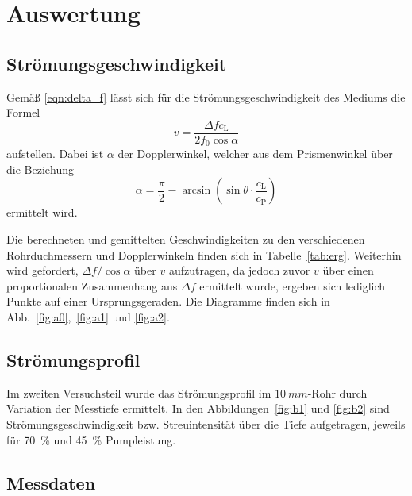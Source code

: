 \section{Auswertung}
\label{sec:Auswertung}

\subsection{Strömungsgeschwindigkeit}

Gemäß \eqref{eqn:delta_f} lässt sich für die Strömungsgeschwindigkeit des Mediums die Formel
\begin{equation}
  v = \frac{\Delta f c_\text{L}}{2 f_0 \cos \alpha}
\end{equation}
aufstellen. Dabei ist $\alpha$ der Dopplerwinkel, welcher aus dem Prismenwinkel über die Beziehung
\begin{equation}
  \alpha = \frac{\pi}{2} - \arcsin\left({\sin \theta \cdot \frac{c_\text{L}}{c_\text{P}}}\right)
\end{equation}
ermittelt wird.

Die berechneten und gemittelten Geschwindigkeiten zu den verschiedenen Rohrduchmessern und Dopplerwinkeln finden sich in Tabelle~\ref{tab:erg}. Weiterhin wird gefordert, $\Delta f / \cos \alpha$ über $v$ aufzutragen, da jedoch zuvor $v$ über einen proportionalen Zusammenhang aus $\Delta f$ ermittelt wurde, ergeben sich lediglich Punkte auf einer Ursprungsgeraden. Die Diagramme finden sich in Abb.~\ref{fig:a0},~\ref{fig:a1} und \ref{fig:a2}.


\subsection{Strömungsprofil}
Im zweiten Versuchsteil wurde das Strömungsprofil im $\SI{10}{mm}$-Rohr durch Variation der Messtiefe ermittelt. In den Abbildungen~\ref{fig:b1} und \ref{fig:b2} sind Strömungsgeschwindigkeit bzw. Streuintensität über die Tiefe aufgetragen, jeweils für \SI{70}{\percent} und \SI{45}{\percent} Pumpleistung.

\newpage
\subsection{Messdaten}


